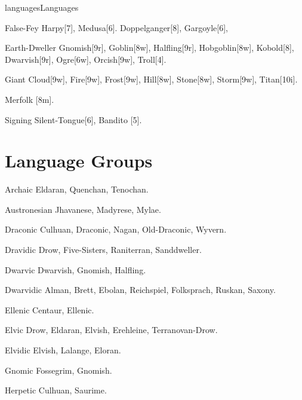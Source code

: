 \begin{Skill}[2.1]{languages}{Languages}
\begin{Description}
\item[False-Fey] Harpy[7], Medusa[6].  Doppelganger[8], Gargoyle[6],

\item[Earth-Dweller] Gnomish[9r], Goblin[8w], Halfling[9r],
  Hobgoblin[8w], Kobold[8], Dwarvish[9r], Ogre[6w], Orcish[9w],
  Troll[4].

\item[Giant] Cloud[9w], Fire[9w], Frost[9w], Hill[8w], Stone[8w],
  Storm[9w], Titan[10i].

\item[Merfolk] [8m]. 

\item[Signing] Silent-Tongue[6], Bandito [5]. 
  
\end{Description}

\section{Language Groups}
\label{languages:groups}

\begin{Description}

\item[Archaic] Eldaran, Quenchan, Tenochan.

\item[Austronesian] Jhavanese, Madyrese, Mylae. 

\item[Draconic] Culhuan, Draconic, Nagan, Old-Draconic, Wyvern.

\item[Dravidic] Drow, Five-Sisters, Raniterran, Sanddweller.

\item[Dwarvic] Dwarvish, Gnomish, Halfling.

\item[Dwarvidic] Alman, Brett, Ebolan, Reichspiel, Folksprach, Ruskan,
  Saxony.

\item[Ellenic] Centaur, Ellenic.

\item[Elvic] Drow, Eldaran, Elvish, Erehleine, Terranovan-Drow.

\item[Elvidic] Elvish, Lalange, Eloran.  

\item[Gnomic] Fossegrim, Gnomish.  

\item[Herpetic] Culhuan, Saurime. 


\end{Description}
\end{Skill}
